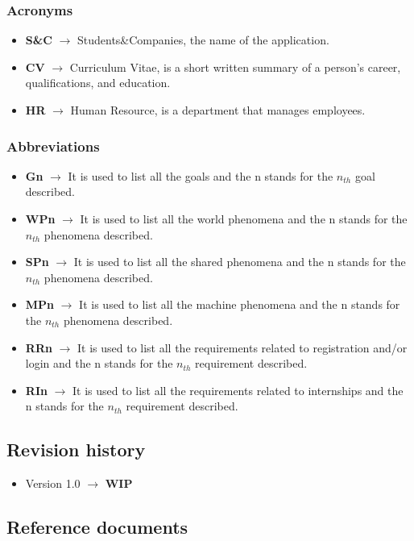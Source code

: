 \documentclass[11pt,twoside]{article}
\begin{document}
		\subsubsection{Acronyms}
\begin{itemize}
\item \textbf{S\&C} $\rightarrow$ Students\&Companies, the name of the application.
\item \textbf{CV} $\rightarrow$ Curriculum Vitae, is a short written summary of a person's career, qualifications, and education.
\item \textbf{HR} $\rightarrow$ Human Resource, is a department that manages employees.
\end{itemize}
		\subsubsection{Abbreviations}
\begin{itemize}
\item \textbf{Gn} $\rightarrow$ It is used to list all the goals and the n stands for the $n_{th}$ goal described.
\item \textbf{WPn} $\rightarrow$ It is used to list all the world phenomena and the n stands for the $n_{th}$ phenomena described.
\item \textbf{SPn} $\rightarrow$ It is used to list all the shared phenomena and the n stands for the $n_{th}$ phenomena described.
\item \textbf{MPn} $\rightarrow$ It is used to list all the machine phenomena and the n stands for the $n_{th}$ phenomena described.
\item \textbf{RRn} $\rightarrow$ It is used to list all the requirements related to registration and/or login and the n stands for the $n_{th}$ requirement described.
\item \textbf{RIn} $\rightarrow$ It is used to list all the requirements related to internships and the n stands for the $n_{th}$ requirement described.
\end{itemize}
		
	\subsection{Revision history}	
\begin{itemize}
\item Version 1.0 $\rightarrow$ \textbf{WIP}
\end{itemize}
	\subsection{Reference documents}
\end{document}
